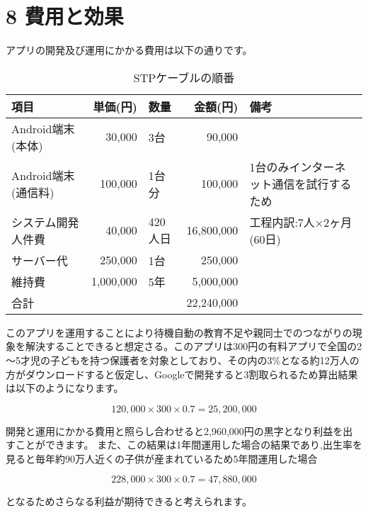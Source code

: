 \documentclass[a4j,titlepage]{jarticle}
\begin{document}
\section{8 費用と効果}
アプリの開発及び運用にかかる費用は以下の通りです。
　\begin{table}[htp]
\begin{center}
  \caption{STPケーブルの順番}
  \begin{tabular}{|l|r|l|r|l|}\hline
    項目& 単価(円) & 数量 & 金額(円) & 備考  \\ \hline 
    Android端末(本体)& 30,000 & 3台 & 90,000 & 　 \\ \hline
    Android端末(通信料)& 100,000 & 1台分 & 100,000 & 1台のみインターネット通信を試行するため  \\ \hline
    システム開発人件費& 40,000 & 420人日 & 16,800,000 & 工程内訳:7人×2ヶ月(60日)  \\ \hline
    サーバー代& 250,000 & 1台 & 250,000 & 　 \\ \hline
    維持費& 1,000,000 & 5年 & 5,000,000 & 　　  \\ \hline
    \multicolumn{3}{|l|}{合計} & 22,240,000 &　 \\ \hline
  \end{tabular}
\end{center}
\end{table}

このアプリを運用することにより待機自動の教育不足や親同士でのつながりの現象を解決することできると想定さる。このアプリは300円の有料アプリで全国の2～5才児の子どもを持つ保護者を対象としており、その内の3\%となる約12万人の方がダウンロードすると仮定し、Googleで開発すると3割取られるため算出結果は以下のようになります。

\begin{equation}
  120,000×300×0.7 = 25,200,000
\end{equation}

開発と運用にかかる費用と照らし合わせると2,960,000円の黒字となり利益を出すことができます。
また、この結果は1年間運用した場合の結果であり,出生率を見ると毎年約90万人近くの子供が産まれているため5年間運用した場合

\begin{equation}
  228,000×300×0.7 = 47,880,000
\end{equation}

となるためさらなる利益が期待できると考えられます。
\end{document}
